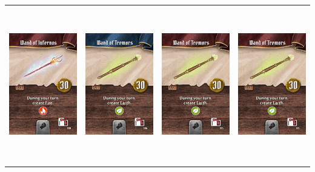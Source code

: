 \documentclass{minimal}
\begin{document}
{\begin{longtable}{llll}
\includegraphics[width=44mm,height=68mm]{./64-151/gh-085b-wand-of-infernos.png} &
\includegraphics[width=44mm,height=68mm]{./64-151/gh-086a-wand-of-tremors.png} &
\includegraphics[width=44mm,height=68mm]{./64-151/gh-086b-wand-of-tremors.png} &
\includegraphics[width=44mm,height=68mm]{./64-151/gh-086b-wand-of-tremors.png}\\ 

\end{longtable}}
\end{document}
